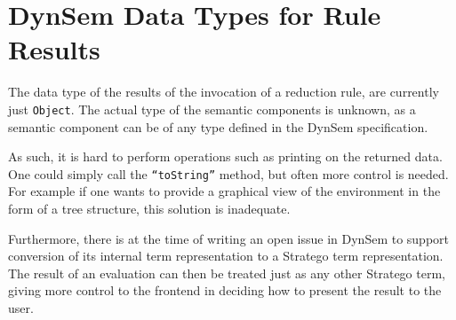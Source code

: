 \section{DynSem Data Types for Rule Results}
\label{sec:dynsem-data-repr}
The data type of the results of the invocation of a reduction rule, are
currently just \texttt{Object}. The actual type of the semantic components is
unknown, as a semantic component can be of any type defined in the DynSem
specification.

As such, it is hard to perform operations such as printing on the returned
data. One could simply call the \texttt{``toString''} method, but often more
control is needed. For example if one wants to provide a graphical view of the
environment in the form of a tree structure, this solution is inadequate.

Furthermore, there is at the time of writing an open issue in DynSem to support
conversion of its internal term representation to a Stratego term
representation. The result of an evaluation can then be treated just as any
other Stratego term, giving more control to the frontend in deciding how to
present the result to the user.

